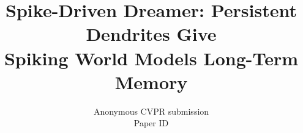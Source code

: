 \documentclass[10pt,twocolumn,letterpaper]{article}
\title{Spike-Driven Dreamer: Persistent Dendrites Give\\Spiking World Models Long-Term Memory}
\author{Anonymous CVPR submission\\Paper ID \paperID}
\begin{document}
\maketitle









{
    \small
    
    
}

\ifwithsupp

\fi
\end{document}
